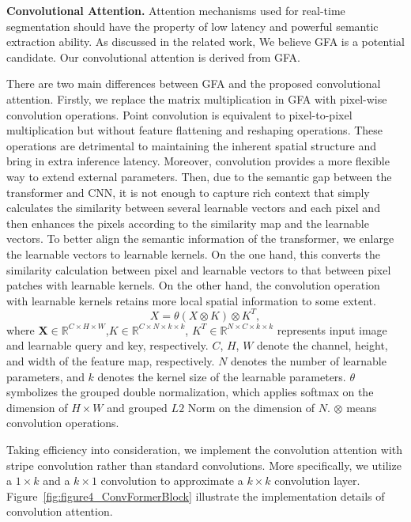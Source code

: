 \documentclass[letterpaper]{article} %
\begin{document}
\noindent
{\bf Convolutional Attention.} 
Attention mechanisms used for real-time segmentation should have the property of low latency and powerful semantic extraction ability. As discussed in the related work, We believe GFA is a potential candidate. Our convolutional attention is derived from GFA. 

There are two main differences between GFA and the proposed convolutional attention.  
Firstly, we replace the matrix multiplication in GFA with pixel-wise convolution operations. Point convolution is equivalent to pixel-to-pixel multiplication but without feature flattening and reshaping operations. These operations are detrimental to maintaining the inherent spatial structure and bring in extra inference latency. Moreover, convolution provides a more flexible way to extend external parameters.
Then, due to the semantic gap between the transformer and CNN, it is not enough to capture rich context that simply calculates the similarity between several learnable vectors and each pixel and then enhances the pixels according to the similarity map and the learnable vectors. To better align the semantic information of the transformer, we enlarge the learnable vectors to learnable kernels. On the one hand, this converts the similarity calculation between pixel and learnable vectors to that between pixel patches with learnable kernels. On the other hand, the convolution operation with learnable kernels retains more local spatial information to some extent. 
\begin{equation}\label{Eq:Conv-Former Attention}
X = \theta \left(X \otimes K\right) \otimes K^{T}, 
\end{equation}
%
where $\mathbf{X}\in\mathbb{R}^{C \times H \times W}$,$K \in \mathbb{R}^{C \times N \times k \times k}$, $K^{T} \in \mathbb{R}^{N \times C \times k \times k}$ represents input image and learnable query and key, respectively. $C$, $H$, $W$ denote the channel, height, and width of the feature map, respectively. $N$ denotes the number of learnable parameters, and $k$ denotes the kernel size of the learnable parameters. $\theta$ symbolizes the grouped double normalization, which applies softmax on the dimension of $H \times W$ and grouped $L2$ Norm on the dimension of $N$. $\otimes$ means convolution operations.

Taking efficiency into consideration, we implement the convolution attention with stripe convolution rather than standard convolutions. More specifically, we utilize a $1 \times k$ and a $k \times 1$ convolution to approximate a $k \times k$ convolution layer. Figure~\ref{fig:figure4_ConvFormerBlock} illustrate the implementation details of convolution attention. 
\end{document}
